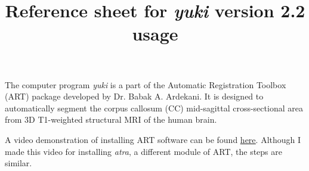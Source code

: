 \documentclass[11pt]{article}
\title{Reference sheet for {\it yuki} version 2.2 usage}
\begin{document}
\maketitle
{} 
The computer program {\it yuki} is a part of the Automatic Registration Toolbox (ART) package 
developed by Dr. Babak A. Ardekani. It is designed to automatically segment the corpus callosum
(CC) mid-sagittal cross-sectional area from 3D T1-weighted structural MRI of the human brain.


A video demonstration of installing ART software can be found
\href{https://www.youtube.com/watch?v=xCawMFQr50M\&t=26s}{\underline{here}}.
Although I made this video for installing {\it atra}, a different module of ART, 
the steps are similar.
\end{document}
